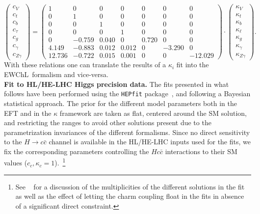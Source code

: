 \begin{equation}
  \label{eq:kappa.EFT.7}
  \begin{pmatrix}
    c_{V}\\
    c_{t}\\
    c_{b}\\
    c_{\tau}\\
    c_{g}\\
    c_{\gamma}\\
    c_{Z\gamma}
  \end{pmatrix}
  = 
  \begin{pmatrix}
    1 & 0 & 0 & 0 & 0 & 0 & 0\\
    0 & 1 & 0 & 0 & 0 & 0 & 0\\
    0 & 0 & 1 & 0 & 0 & 0 & 0\\
    0 & 0 & 0 & 1 & 0 & 0 & 0\\
    0 & -0.759 & 0.040 & 0 & 0.720 & 0 & 0\\
    4.149 & -0.883 & 0.012 & 0.012 & 0 & -3.290 & 0\\
    12.736   & -0.722 & 0.015 & 0.001 & 0 & 0 & -12.029
  \end{pmatrix}
  \cdot
  \begin{pmatrix}
    \kappa_{V}\\
    \kappa_{t}\\
    \kappa_{b}\\
    \kappa_{\ell}\\
    \kappa_{g}\\
    \kappa_{\gamma}\\
    \kappa_{Z\gamma}
  \end{pmatrix}.
\end{equation}
%
With these relations one can translate the results of a $\kappa_i$ fit into the EWChL~formalism and vice-versa. \\

\noindent
{\bf Fit to HL/HE-LHC Higgs precision data.}
The fits presented in what follows have been performed using the {\tt HEPfit} package~\cite{hepfit,hepfitsite}, and following a Bayesian statistical approach.  
 The prior for the different model parameters both in the EFT and in the $\kappa$ framework are taken as flat, centered around the SM solution, and restricting the ranges to avoid other solutions present due to the parametrization invariances of the different formalisms.
Since no direct sensitivity to the $H\to c\bar{c}$ channel is available in the HL/HE-LHC inputs used for the fits, we fix the corresponding parameters controlling the $Hc\bar c$ interactions to their SM values ($c_c,\kappa_c=1$).~\footnote{See ~\cite{deBlas:2018tjm} for a discussion of the multiplicities of the different solutions in the fit as well as the effect of letting the charm coupling float in the fits in absence of a significant direct constraint.}

